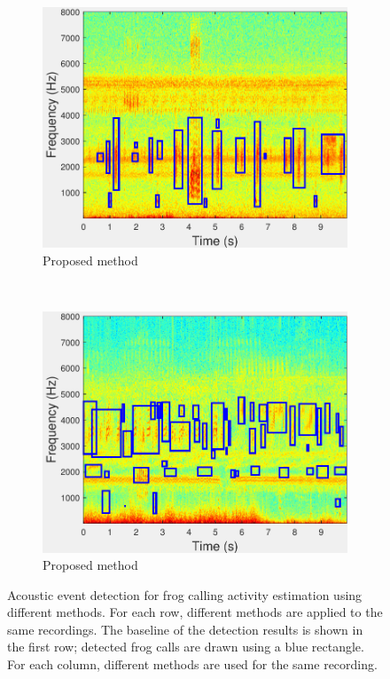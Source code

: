 \begin{figure}
                \begin{subfigure}[b]{0.35\textwidth}
       \includegraphics[width=\textwidth]{image/Ch7/AED_Jie.pdf}
                \caption{Proposed method}
        \end{subfigure}     
~
        \begin{subfigure}[b]{0.35\textwidth}
       \includegraphics[width=\textwidth]{image/Ch7/AED_Jie_2.pdf}
                \caption{Proposed method}
        \end{subfigure}                
        \caption[Acoustic event detection for frog abundance monitoring using different methods]{Acoustic event detection for frog calling activity estimation using different methods. For each row, different methods are applied to the same recordings. The baseline of the detection results is shown in the first row; detected frog calls are drawn using a blue rectangle. For each column, different methods are used for the same recording.}        
        \label{fig:Ch7_AED}
\end{figure}


